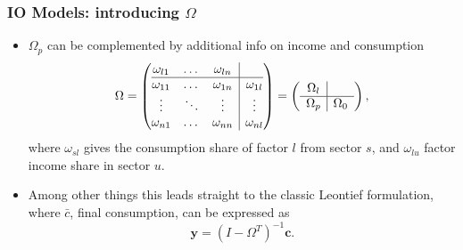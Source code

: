 \documentclass[utf8,aspectratio=169,ngerman,english]{beamer}
\begin{document}
\begin{frame}
\frametitle{IO Models: introducing $\Omega$}
\begin{itemize}
\item{$\Omega_p$ can be complemented by additional info on income and consumption}
\begin{align}
  \label{eq:iomatrix}
  \Omega = \left( \begin{array}{@{}ccc|c@{}}
    \omega_{l1} &\dots &\omega_{ln} &  \\ \hline
    \omega_{11} & \dots &\omega_{1n} & \omega_{1l}\\ 
    \vdots &\ddots &\vdots & \vdots\\ 
    \omega_{n1} & \dots & \omega_{nn} & \omega_{nl}    
    \end{array} \right) = 
    \left( \begin{array}{c|c}
    \Omega_l & \\ \hline
    \Omega_p & \Omega_0\\ 
  \end{array} \right),
\end{align}
where $\omega_{sl}$ gives the consumption share of factor $l$ from sector $s$, and $\omega_{lu}$ factor income share in sector $u$. 

  \item Among other things this leads straight to the classic Leontief formulation, where $\bar c$, final consumption, can be expressed as 
    $$\mathbf y = (I - \Omega^T)^{-1} \mathbf c.$$
\end{itemize}
\end{frame}

\end{document}
